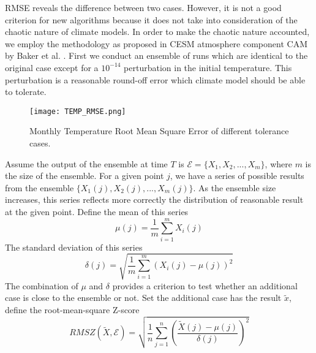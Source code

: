 RMSE reveals the difference between two cases. However, it is not a good criterion for new algorithms because it does not take into consideration of the chaotic nature of climate models.  In order to make the chaotic nature accounted, we employ the methodology as proposed in CESM atmosphere component CAM by Baker et al. \cite{baker2014methodology}. First we conduct an ensemble of runs which are identical to the original case except for a $10^{-14}$ perturbation in the initial temperature. This perturbation is a reasonable round-off error which climate model should be able to tolerate. 
\begin{figure}[!t]
\begin{center}
\texttt{[image: TEMP\_RMSE.png]}
\end{center}
\caption[] {Monthly Temperature Root Mean Square Error of different tolerance cases.}
\label{fig:ssh_rmse_t}

\end{figure}

Assume the output of the ensemble at time $T$ is $\mathcal{E}=\{X_1,X_2,...,X_m\}$, where 
$m$ is the size of the ensemble. 
For a given point $j$, we have a series of possible results from the ensemble $\{X_1(j),X_2(j),...,X_m(j)\}$.
As the ensemble size increases, this series reflects more correctly the distribution of reasonable result at the given point. 
Define the mean of this series $$ \mu (j) = \frac{1}{m}\sum_{i=1}^m X_i(j) $$
The standard deviation of this series  $$ \delta (j) = \sqrt{\frac{1}{m} \sum_{i=1}^m (X_i(j)-\mu(j))^2 }$$
The combination of $\mu$ and $\delta$ provides a criterion to test whether an additional case is close to the ensemble or not. 
Set the additional case has the result $\tilde{x}$, define the root-mean-square Z-score 
$$ RMSZ(\tilde{X}, \mathcal{E}) =  \sqrt{\frac{1}{n}\sum_{j=1}^n(\frac{\tilde{X}(j) -\mu (j)}{\delta (j)})^2}$$


